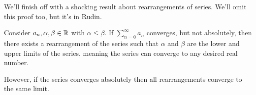 \documentclass[../m131main.tex]{subfiles}
\begin{document}
We'll finish off with a shocking result about rearrangements of series.
We'll omit this proof too, but it's in Rudin.

\begin{theorem}
    Consider $a_n, \alpha, \beta \in \mathbb{R}$ with $\alpha \leq \beta$.
    If $\sum_{n=0}^{\infty} a_n$ converges, but not absolutely, then there exists a rearrangement of the series such that $\alpha$ and $\beta$ are the lower and upper limits of the series, meaning the series can converge to any desired real number.

    However, if the series converges absolutely then all rearrangements converge to the same limit.
\end{theorem}
\end{document}
